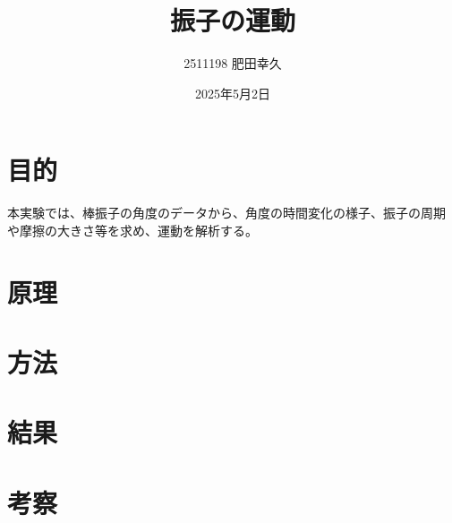 \documentclass{jarticle}
\title{振子の運動}
\author{2511198 肥田幸久}
\date{2025年5月2日}
\begin{document}
\maketitle

\section{目的}

本実験では、棒振子の角度のデータから、角度の時間変化の様子、振子の周期
や摩擦の大きさ等を求め、運動を解析する。

\section{原理}

\section{方法}

\section{結果}

\section{考察}
\end{document}
